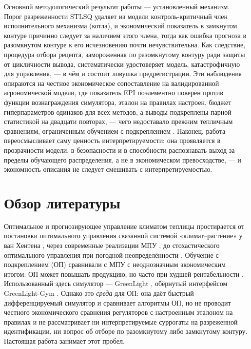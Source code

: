 \documentclass[preprint,3p]{elsarticle}
\begin{document}
Основной методологический результат работы — установленный механизм. Порог разреженности
STLSQ удаляет из модели контроль-критичный член исполнительного механизма (котла), и
экономический показатель в замкнутом контуре причинно следует за наличием этого члена, тогда
как ошибка прогноза в разомкнутом контуре к его исчезновению почти нечувствительна. Как
следствие, процедура отбора рецепта, замороженная по разомкнутому контуру ради защиты от
цикличности вывода, систематически удостоверяет модель, катастрофичную для управления, — в
чём и состоит ловушка предрегистрации. Эти наблюдения опираются на честное экономическое
сопоставление на валидированной агрономической модели, где показатель EPI поэлементно поверен
против функции вознаграждения симулятора, эталон на правилах настроен, бюджет гиперпараметров
одинаков для всех методов, а выводы подкреплены парной статистикой на двадцати повторах, —
чего недоставало прежним тепличным сравнениям, ограниченным обучением с подкреплением
\citep{vanlaatum2025greenlightgym}. Наконец, работа переосмысливает саму ценность
интерпретируемости: она проявляется в прозрачности модели, в безопасности и в способности
распознавать выход за пределы обучающего распределения, а не в экономическом превосходстве, —
и экономность описания не следует смешивать с интерпретируемостью.

\section{Обзор литературы}
\label{sec:related}

Оптимальное и прогнозирующее управление климатом теплицы простирается от постановки
оптимального управления связанной системой «климат--растение» у ван Хентена
\citep{vanhenten1994thesis,vanhenten2009timescale}, через современные реализации МПУ
\citep{lin2021greenhousempc,chenyou2020ddrmpc}, до стохастического оптимального управления при
погодной неопределённости \citep{vanmourik2023stochastic}. Обучение с подкреплением (ОП)
сравнивали с МПУ с неоднозначным экономическим итогом: ОП может повышать продукцию, но часто
при худшей рентабельности \citep{morcego2023rlvsmpc,mallick2024rlmpc,adaptiverobust2025greenhouse}.
Использованный здесь симулятор — GreenLight \citep{katzin2020greenlight,katzin2021led},
обёрнутый интерфейсом GreenLight-Gym \citep{vanlaatum2025greenlightgym}. Однако это
\emph{среда} для ОП: она даёт быстрый дифференцируемый симулятор и сравнивает
алгоритмы ОП, но не проводит честного экономического сравнения регуляторов с настроенным
эталоном на правилах и не рассматривает ни интерпретируемые суррогаты на разреженной
идентификации, ни вопрос об отборе по разомкнутому либо замкнутому контуру. Настоящая работа
занимает этот пробел.
\end{document}
